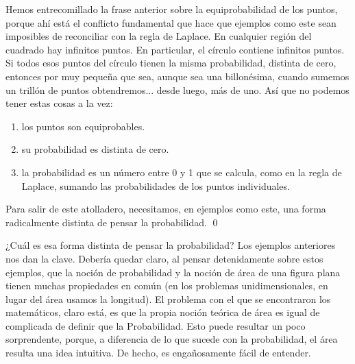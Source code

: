 \begin{Ejemplo}
Hemos entrecomillado la frase anterior sobre la equiprobabilidad de los puntos, porque ahí está el conflicto fundamental que hace que ejemplos como este sean imposibles de reconciliar con la regla de Laplace. En cualquier región del cuadrado hay infinitos puntos. En particular, el círculo contiene infinitos puntos. Si todos esos puntos del círculo tienen la misma probabilidad, distinta de cero, entonces por muy pequeña que sea, aunque sea una billonésima, cuando sumemos un trillón de puntos obtendremos... desde luego, más de uno. Así que no podemos tener estas cosas a la vez:
\begin{enumerate}
    \item los puntos son equiprobables.
    \item su probabilidad es distinta de cero.
    \item la probabilidad es un número entre 0 y 1 que se calcula, como en la regla de Laplace, sumando las probabilidades de los puntos individuales.
\end{enumerate}
Para salir de este atolladero, necesitamos, en ejemplos como este, una forma radicalmente distinta de pensar la probabilidad.
\qed
\end{Ejemplo}
¿Cuál es esa forma distinta de pensar la probabilidad? Los ejemplos anteriores nos dan la clave. Debería quedar claro, al pensar detenidamente sobre estos ejemplos, que la noción de probabilidad y la noción de área de una figura plana tienen muchas propiedades en común (en los problemas unidimensionales, en lugar del área usamos la longitud).  El problema con el que se encontraron los matemáticos, claro está, es que la propia noción teórica de área es igual de complicada de definir que la Probabilidad. Esto puede resultar un poco sorprendente, porque, a diferencia de lo que sucede con la probabilidad, el área resulta una idea intuitiva. De hecho, es engañosamente fácil de entender.
